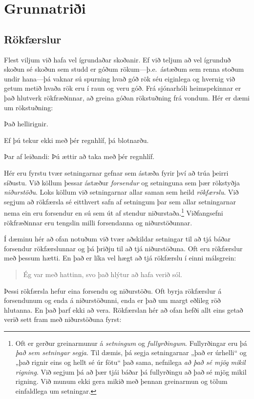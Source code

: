 \part{Grunnatriði}
\label{ch.intro}

\chapter{Rökfærslur}\label{argRaining}\label{s:Arguments}

Flest viljum við hafa vel ígrundaðar skoðanir. Ef við teljum að vel ígrunduð skoðun sé skoðun sem studd er góðum rökum---þ.e.\ ástæðum sem renna stoðum undir hana---þá vaknar sú spurning hvað góð rök séu eiginlega og hvernig við getum metið hvaða rök eru í raun og veru góð. Frá sjónarhóli heimspekinnar er það hlutverk rökfræðinnar, að greina góðan rökstuðning frá vondum. Hér er dæmi um rökstuðning:

	\begin{earg}
		\item[] Það hellirignir.
		\item[] Ef þú tekur ekki með þér regnhlíf, þá blotnarðu.
		\item[Þar af leiðandi:] Þú ættir að taka með þér regnhlíf.
	\end{earg}
	Hér eru fyrstu tvær setningarnar gefnar sem ástæða fyrir því að trúa þeirri síðustu. Við köllum þessar ástæður \emph{forsendur} og setninguna sem þær rökstyðja \emph{niðurstöðu}. Loks köllum við setningarnar allar saman sem heild \emph{rökfærslu}. Við segjum að rökfærsla sé eitthvert safn af setningum þar sem allar setningarnar nema ein eru forsendur en sú sem út af stendur niðurstaða.\footnote{Oft er gerður greinarmunur á \emph{setningum} og \emph{fullyrðingum}. Fullyrðingar eru þá \emph{það sem setningar segja}. Til dæmis, þá segja setningarnar „það er úrhelli“ og „það rignir eins og hellt sé úr fötu“ það sama, nefnilega \emph{að það sé mjög mikil rigning}. Við segjum þá að þær tjái báðar þá fullyrðingu að það sé mjög mikil rigning. Við munum ekki gera mikið með þennan greinarmun og tölum einfaldlega um setningar. } Viðfangsefni rökfræðinnar eru tengslin milli forsendanna og niðurstöðunnar.

Í dæminu hér að ofan notuðum við tvær aðskildar setningar til að tjá báðar forsendur rökfærslunnar og þá þriðju til að tjá niðurstöðuna. Oft eru rökfærslur með þessum hætti. En það er líka vel hægt að tjá rökfærslu í einni málsgrein:

	\begin{quote}
		 Ég var með hattinn, svo það hlýtur að hafa verið sól.
	\end{quote}
Þessi rökfærsla hefur eina forsendu og niðurstöðu. Oft byrja rökfærslur á forsendunum og enda á niðurstöðunni, enda er það um margt eðlileg röð hlutanna. En það þarf ekki að vera. Rökfærslan hér að ofan hefði allt eins getað verið sett fram með niðurstöðuna fyrst:

